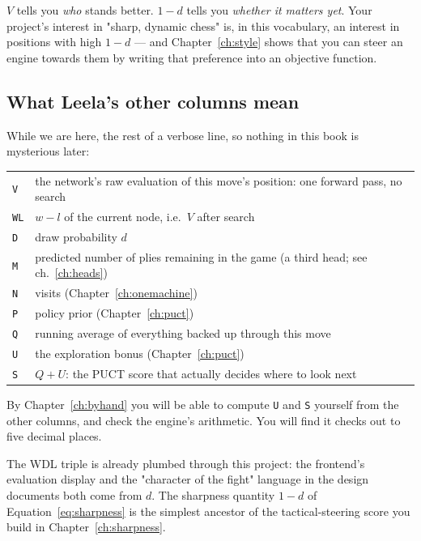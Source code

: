 \begin{keyidea}
$V$ tells you \emph{who} stands better. $1-d$ tells you \emph{whether it matters yet}. Your
project's interest in "sharp, dynamic chess" is, in this vocabulary, an interest in
positions with high $1-d$ --- and Chapter~\ref{ch:style} shows that you can steer an engine
towards them by writing that preference into an objective function.
\end{keyidea}

\subsection{What Leela's other columns mean}

While we are here, the rest of a verbose line, so nothing in this book is mysterious later:

\begin{center}
\begin{tabular}{@{}ll@{}}
\toprule
\texttt{V} & the network's raw evaluation of this move's position: one forward pass, no search \\
\texttt{WL} & $w - l$ of the current node, i.e.\ $V$ after search \\
\texttt{D} & draw probability $d$ \\
\texttt{M} & predicted number of plies remaining in the game (a third head; see ch.~\ref{ch:heads}) \\
\texttt{N} & visits (Chapter~\ref{ch:onemachine}) \\
\texttt{P} & policy prior (Chapter~\ref{ch:puct}) \\
\texttt{Q} & running average of everything backed up through this move \\
\texttt{U} & the exploration bonus (Chapter~\ref{ch:puct}) \\
\texttt{S} & $Q + U$: the PUCT score that actually decides where to look next \\
\bottomrule
\end{tabular}
\end{center}

By Chapter~\ref{ch:byhand} you will be able to compute \texttt{U} and \texttt{S} yourself
from the other columns, and check the engine's arithmetic. You will find it checks out to
five decimal places.

\begin{repobox}[title={in this repository}]
The WDL triple is already plumbed through this project: the frontend's evaluation display and
the "character of the fight" language in the design documents both come from $d$. The
sharpness quantity $1-d$ of Equation~\eqref{eq:sharpness} is the simplest ancestor of the
tactical-steering score you build in Chapter~\ref{ch:sharpness}.
\end{repobox}

